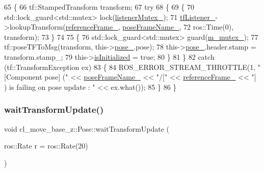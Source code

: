 \begin{DoxyCode}
65     \{
66         tf::StampedTransform transform;
67         \textcolor{keywordflow}{try}
68         \{
69             \{
70                 std::lock\_guard<std::mutex> lock(\hyperlink{classcl__move__base__z_1_1Pose_ae1b5ee53f49d74926e04a477d792f1d0}{listenerMutex\_});
71                 \hyperlink{classcl__move__base__z_1_1Pose_a188a5ac62d5424c1eacd667868049962}{tfListener\_}->lookupTransform(\hyperlink{classcl__move__base__z_1_1Pose_a6a7a593232b6edaf99103d48ad8da9d3}{referenceFrame\_}, 
      \hyperlink{classcl__move__base__z_1_1Pose_a4f45be8e2fd73e618d815582a4ca8efe}{poseFrameName\_},
72                                                   ros::Time(0), transform);
73             \}
74 
75             \{
76                 std::lock\_guard<std::mutex> guard(\hyperlink{classcl__move__base__z_1_1Pose_a73ed2daba3e473e156cab751fb37b58f}{m\_mutex\_});
77                 tf::poseTFToMsg(transform, this->\hyperlink{classcl__move__base__z_1_1Pose_a9da7acf880968a3c220b8436fd0bb6ef}{pose\_}.pose);
78                 this->\hyperlink{classcl__move__base__z_1_1Pose_a9da7acf880968a3c220b8436fd0bb6ef}{pose\_}.header.stamp = transform.stamp\_;
79                 this->\hyperlink{classcl__move__base__z_1_1Pose_a49df3a978021edb71a48ef5e6d8e75a8}{isInitialized} = \textcolor{keyword}{true};
80             \}
81         \}
82         \textcolor{keywordflow}{catch} (tf::TransformException ex)
83         \{
84             ROS\_ERROR\_STREAM\_THROTTLE(1, \textcolor{stringliteral}{"[Component pose] ("} << \hyperlink{classcl__move__base__z_1_1Pose_a4f45be8e2fd73e618d815582a4ca8efe}{poseFrameName\_} << \textcolor{stringliteral}{"/["} << 
      \hyperlink{classcl__move__base__z_1_1Pose_a6a7a593232b6edaf99103d48ad8da9d3}{referenceFrame\_} << \textcolor{stringliteral}{"] ) is failing on pose update : "} << ex.what());
85         \}
86     \}
\end{DoxyCode}
\mbox{\label{classcl__move__base__z_1_1Pose_a5f8576c3dacfb2f2e7f9df5105c480ea}} 
\subsubsection{\texorpdfstring{wait\+Transform\+Update()}{waitTransformUpdate()}}
{\footnotesize\ttfamily void cl\+\_\+move\+\_\+base\+\_\+z\+::\+Pose\+::wait\+Transform\+Update (\begin{DoxyParamCaption}\item[{ros\+::\+Rate}]{r = {\ttfamily ros\+:\+:Rate(20)} }\end{DoxyParamCaption})}



